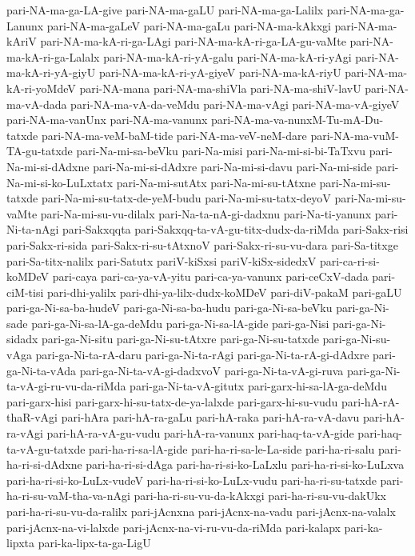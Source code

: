 {pari-NA-ma-ga-LA-give
pari-NA-ma-gaLU
pari-NA-ma-ga-Lalilx
pari-NA-ma-ga-Lanunx
pari-NA-ma-gaLeV
pari-NA-ma-gaLu
pari-NA-ma-kAkxgi
pari-NA-ma-kAriV
pari-NA-ma-kA-ri-ga-LAgi
pari-NA-ma-kA-ri-ga-LA-gu-vaMte
pari-NA-ma-kA-ri-ga-Lalalx
pari-NA-ma-kA-ri-yA-galu
pari-NA-ma-kA-ri-yAgi
pari-NA-ma-kA-ri-yA-giyU
pari-NA-ma-kA-ri-yA-giyeV
pari-NA-ma-kA-riyU
pari-NA-ma-kA-ri-yoMdeV
pari-NA-mana
pari-NA-ma-shiVla
pari-NA-ma-shiV-lavU
pari-NA-ma-vA-dada
pari-NA-ma-vA-da-veMdu
pari-NA-ma-vAgi
pari-NA-ma-vA-giyeV
pari-NA-ma-vanUnx
pari-NA-ma-vanunx
pari-NA-ma-va-nunxM-Tu-mA-Du-tatxde
pari-NA-ma-veM-baM-tide
pari-NA-ma-veV-neM-dare
pari-NA-ma-vuM-TA-gu-tatxde
pari-Na-mi-sa-beVku
pari-Na-misi
pari-Na-mi-si-bi-TaTxvu
pari-Na-mi-si-dAdxne
pari-Na-mi-si-dAdxre
pari-Na-mi-si-davu
pari-Na-mi-side
pari-Na-mi-si-ko-LuLxtatx
pari-Na-mi-sutAtx
pari-Na-mi-su-tAtxne
pari-Na-mi-su-tatxde
pari-Na-mi-su-tatx-de-yeM-budu
pari-Na-mi-su-tatx-deyoV
pari-Na-mi-su-vaMte
pari-Na-mi-su-vu-dilalx
pari-Na-ta-nA-gi-dadxnu
pari-Na-ti-yanunx
pari-Ni-ta-nAgi
pari-Sakxqqta
pari-Sakxqq-ta-vA-gu-titx-dudx-da-riMda
pari-Sakx-risi
pari-Sakx-ri-sida
pari-Sakx-ri-su-tAtxnoV
pari-Sakx-ri-su-vu-dara
pari-Sa-titxge
pari-Sa-titx-nalilx
pari-Satutx
pariV-kiSxsi
pariV-kiSx-sidedxV
pari-ca-ri-si-koMDeV
pari-caya
pari-ca-ya-vA-yitu
pari-ca-ya-vanunx
pari-ceCxV-dada
pari-ciM-tisi
pari-dhi-yalilx
pari-dhi-ya-lilx-dudx-koMDeV
pari-diV-pakaM
pari-gaLU
pari-ga-Ni-sa-ba-hudeV
pari-ga-Ni-sa-ba-hudu
pari-ga-Ni-sa-beVku
pari-ga-Ni-sade
pari-ga-Ni-sa-lA-ga-deMdu
pari-ga-Ni-sa-lA-gide
pari-ga-Nisi
pari-ga-Ni-sidadx
pari-ga-Ni-situ
pari-ga-Ni-su-tAtxre
pari-ga-Ni-su-tatxde
pari-ga-Ni-su-vAga
pari-ga-Ni-ta-rA-daru
pari-ga-Ni-ta-rAgi
pari-ga-Ni-ta-rA-gi-dAdxre
pari-ga-Ni-ta-vAda
pari-ga-Ni-ta-vA-gi-dadxvoV
pari-ga-Ni-ta-vA-gi-ruva
pari-ga-Ni-ta-vA-gi-ru-vu-da-riMda
pari-ga-Ni-ta-vA-gitutx
pari-garx-hi-sa-lA-ga-deMdu
pari-garx-hisi
pari-garx-hi-su-tatx-de-ya-lalxde
pari-garx-hi-su-vudu
pari-hA-rA-thaR-vAgi
pari-hAra
pari-hA-ra-gaLu
pari-hA-raka
pari-hA-ra-vA-davu
pari-hA-ra-vAgi
pari-hA-ra-vA-gu-vudu
pari-hA-ra-vanunx
pari-haq-ta-vA-gide
pari-haq-ta-vA-gu-tatxde
pari-ha-ri-sa-lA-gide
pari-ha-ri-sa-le-La-side
pari-ha-ri-salu
pari-ha-ri-si-dAdxne
pari-ha-ri-si-dAga
pari-ha-ri-si-ko-LaLxlu
pari-ha-ri-si-ko-LuLxva
pari-ha-ri-si-ko-LuLx-vudeV
pari-ha-ri-si-ko-LuLx-vudu
pari-ha-ri-su-tatxde
pari-ha-ri-su-vaM-tha-va-nAgi
pari-ha-ri-su-vu-da-kAkxgi
pari-ha-ri-su-vu-dakUkx
pari-ha-ri-su-vu-da-ralilx
pari-jAcnxna
pari-jAcnx-na-vadu
pari-jAcnx-na-valalx
pari-jAcnx-na-vi-lalxde
pari-jAcnx-na-vi-ru-vu-da-riMda
pari-kalapx
pari-ka-lipxta
pari-ka-lipx-ta-ga-LigU
}
